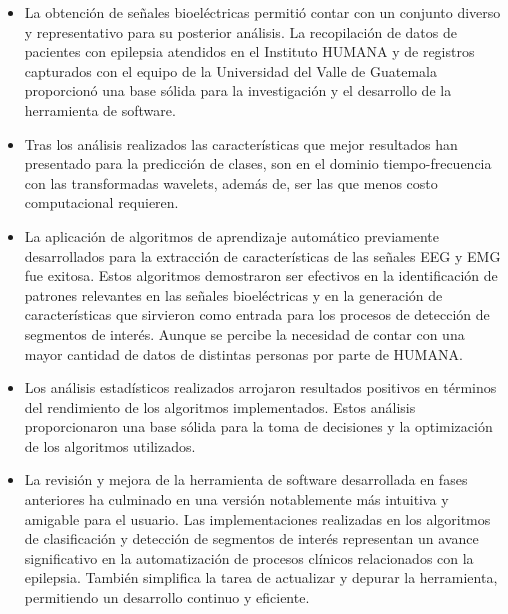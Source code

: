 \begin{itemize}
    \item La obtención de señales bioeléctricas permitió contar con un conjunto diverso y representativo para su posterior análisis. La recopilación de datos de pacientes con epilepsia atendidos en el Instituto HUMANA y de registros capturados con el equipo de la Universidad del Valle de Guatemala proporcionó una base sólida para la investigación y el desarrollo de la herramienta de software.

    \item Tras los análisis realizados las características que mejor resultados han presentado para la predicción de clases, son en el dominio tiempo-frecuencia con las transformadas wavelets, además de, ser las que menos costo computacional requieren. 
    
    \item La aplicación de algoritmos de aprendizaje automático previamente desarrollados para la extracción de características de las señales EEG y EMG fue exitosa. Estos algoritmos demostraron ser efectivos en la identificación de patrones relevantes en las señales bioeléctricas y en la generación de características que sirvieron como entrada para los procesos de detección de segmentos de interés. Aunque se percibe la necesidad de contar con una mayor cantidad de datos de distintas personas por parte de HUMANA.
    
    
    \item Los análisis estadísticos realizados arrojaron resultados positivos en términos del rendimiento de los algoritmos implementados. Estos análisis proporcionaron una base sólida para la toma de decisiones y la optimización de los algoritmos utilizados. 
    
    \item La revisión y mejora de la herramienta de software desarrollada en fases anteriores ha culminado en una versión notablemente más intuitiva y amigable para el usuario. Las implementaciones realizadas en los algoritmos de clasificación y detección de segmentos de interés  representan un avance significativo en la automatización de procesos clínicos relacionados con la epilepsia. También simplifica la tarea de actualizar y depurar la herramienta, permitiendo un desarrollo continuo y eficiente.
\end{itemize}